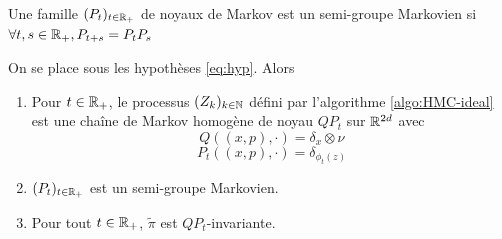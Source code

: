 \documentclass[10pt,a4paper]{article}
\begin{document}
\begin{Def}
	Une famille $(P_t)_{t \in \mathbb{R}_+}$ de noyaux de Markov est un semi-groupe Markovien si $\forall t,s \in \mathbb{R}_+, P_{t+s} = P_t P_s$
\end{Def}

\begin{Prop}\label{prop:inv-ideal}
	On se place sous les hypothèses \eqref{eq:hyp}. Alors

	\begin{enumerate}
		\item Pour $t \in \mathbb{R}_+$, le processus $(Z_k)_{k \in \mathbb{N}}$ défini par l'algorithme \ref{algo:HMC-ideal} est une chaîne de Markov homogène de noyau $QP_t$ sur $\mathbb{R}^{2d}$ avec
		$$
		Q((x,p),\cdot) = \delta_x \otimes \nu
		$$
		$$
		P_t((x,p),\cdot) = \delta_{\phi_t(z)}
		$$
		\item $(P_t)_{t \in \mathbb{R}_+}$ est un semi-groupe Markovien.
		\item Pour tout $t \in \mathbb{R}_+$, $\widetilde{\pi}$ est $QP_t$-invariante. 
	\end{enumerate}
\end{Prop}
\end{document}
